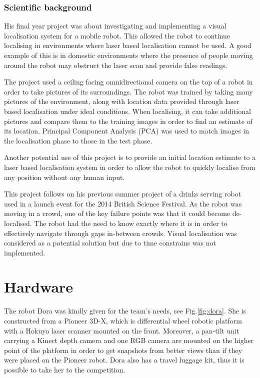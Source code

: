 \documentclass[conference]{IEEEtran}
\begin{document}
\subsubsection*{Scientific background}
 
His final year project was about investigating and implementing a visual localisation system for a mobile robot. This allowed the robot to continue localising in environments where laser based localisation cannot be used. A good example of this is in domestic environments where the presence of people moving around the robot may obstruct the laser scan and provide false readings.
 
The project used a ceiling facing omnidirectional camera on the top of a robot in order to take pictures of its surroundings.
The robot was trained by taking many pictures of the environment, along with location data provided through laser based localisation under ideal conditions. When localising, it can take additional pictures and compare them to the training images in order to find an estimate of its location. Principal Component Analysis (PCA) was used to match images in the localisation phase to those in the test phase. 

Another potential use of this project is to provide an initial location estimate to a laser based localisation system in order to allow the robot to quickly localise from any position without any human input.

This project follows on his previous summer project of a drinks serving robot used in a launch event for the 2014 British Science Festival. As the robot was moving in a crowd, one of the key failure points was that it could become de-localised. The robot had the need to know exactly where it is in order to effectively navigate through gaps in-between crowds. Visual localisation was considered as a potential solution but due to time constrains was not implemented.

\section{\label{sec:hardware}Hardware}
The robot Dora was kindly given for the team's needs, see Fig.\ref{fig:dora}. She is constructed from a Pioneer 3D-X, which is differential wheel robotic platform with a Hokuyo laser scanner mounted on the front. Moreover, a pan-tilt unit carrying a Kinect depth camera and one RGB camera are mounted on the higher point of the platform in order to get snapshots from better views than if they were placed on the Pioneer robot. Dora also has a travel luggage kit, thus it is possible to take her to the competition.
\end{document}
